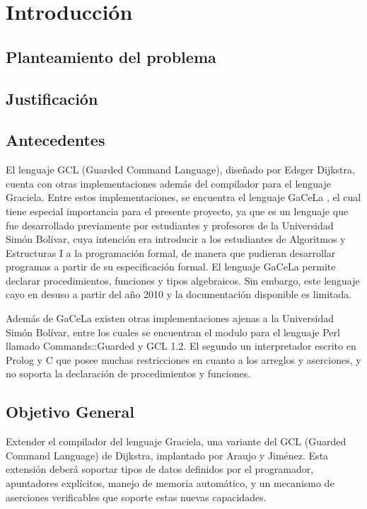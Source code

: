 \chapter*{Introducción}
\label{intro}

\section*{Planteamiento del problema}

\section*{Justificación}

\section*{Antecedentes}

El lenguaje  GCL (Guarded Command Language), diseñado por Edsger Dijkstra,
cuenta con otras implementaciones además del compilador para el lenguaje
Graciela. Entre estos implementaciones, se encuentra el lenguaje GaCeLa
, el cual tiene especial importancia para el presente
proyecto, ya que es un lenguaje que fue desarrollado previamente por
estudiantes y profesores de la Universidad Simón Bolívar, cuya intención era
introducir a los estudiantes de Algoritmos y Estructuras I a la programación
formal, de manera que pudieran desarrollar programas a partir de su
especificación formal. El lenguaje GaCeLa permite declarar procedimientos,
funciones y tipos algebraicos. Sin embargo, este lenguaje cayo en desuso a
partir del año 2010 y la documentación disponible es limitada.

Además de GaCeLa existen otras implementaciones ajenas a la Universidad Simón
Bolívar, entre los cuales se encuentran el modulo para el lenguaje Perl
llamado Commands::Guarded y GCL 1.2. El segundo un interpretador escrito en
Prolog y C que posee muchas restricciones en cuanto a los arreglos y
aserciones, y no soporta la declaración de procedimientos y funciones.


\section*{Objetivo General}

Extender el compilador del lenguaje Graciela, una variante del GCL (Guarded
Command Language) de Dijkstra, implantado por Araujo y Jiménez. Esta extensión
deberá soportar tipos de datos definidos por el programador, apuntadores
explícitos, manejo de memoria automático, y un mecanismo de aserciones
verificables que soporte estas nuevas capacidades.

